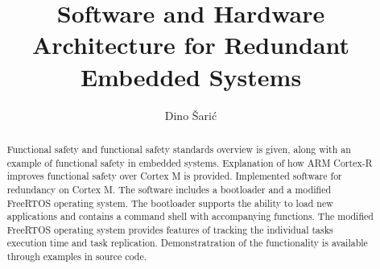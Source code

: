 \documentclass[utf8, diplomski, english, numeric]{fer}
\begin{document}

\title{Software and Hardware Architecture for Redundant Embedded Systems}

\author{Dino Šarić}

\maketitle

\izvornik
%


\tableofcontents
\listoffigures
\listoftables













\begin{abstract}

Functional safety and functional safety standards overview is given, along with an example of functional safety in embedded systems. Explanation of how ARM Cortex-R improves functional safety over Cortex M is provided. Implemented software for redundancy on Cortex M. The software includes a bootloader and a modified FreeRTOS operating system. The bootloader supports the ability to load new applications and contains a command shell with accompanying functions. The modified FreeRTOS operating system provides features of tracking the individual tasks execution time and task replication. Demonstratration of the functionality is available through examples in source code.

\end{abstract}
\end{document}
